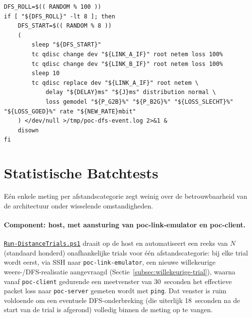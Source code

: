 \begin{listing}[h]
\begin{lstlisting}[style=bashstyle]
DFS_ROLL=$(( RANDOM % 100 ))
if [ "${DFS_ROLL}" -lt 8 ]; then
    DFS_START=$(( RANDOM % 8 ))
    (
        sleep "${DFS_START}"
        tc qdisc change dev "${LINK_A_IF}" root netem loss 100%
        tc qdisc change dev "${LINK_B_IF}" root netem loss 100%
        sleep 10
        tc qdisc replace dev "${LINK_A_IF}" root netem \
            delay "${DELAY}ms" "${J}ms" distribution normal \
            loss gemodel "${P_G2B}%" "${P_B2G}%" "${LOSS_SLECHT}%" "${LOSS_GOED}%" rate "${NEW_RATE}mbit"
    ) </dev/null >/tmp/poc-dfs-event.log 2>&1 &
    disown
fi
\end{lstlisting}
\caption[Willekeurige DFS-onderbreking]{Fragment uit \texttt{poc-run-trial.sh}: bij 8\%
van de trials treedt, op een willekeurig moment binnen de eerste 8~seconden, een volledige
onderbreking van 10~seconden op (Channel Move + Channel Availability Check), waarna het
kanaal automatisch herstelt. De achtergrondtaak wordt met \texttt{disown} losgekoppeld
zodat ze de SSH-sessie die haar opstartte overleeft. Uitgevoerd op:
\texttt{poc-link-emulator}.}
\label{lst:dfs-variatie}
\end{listing}

\section{Statistische Batchtests}%
\label{sec:sim-trials}

Eén enkele meting per afstandscategorie zegt weinig over de betrouwbaarheid van de
architectuur onder wisselende omstandigheden.

\paragraph{Component: host, met aansturing van poc-link-emulator en poc-client.}
\href{code/scripts/Run-DistanceTrials.ps1}{\texttt{Run-DistanceTrials.ps1}} draait op de
host en automatiseert een reeks van $N$ (standaard honderd) onafhankelijke trials voor
één afstandscategorie: bij elke trial wordt eerst, via SSH naar
\texttt{poc-link-emulator}, een nieuwe willekeurige weers-/DFS-realisatie aangevraagd
(Sectie~\ref{subsec:willekeurige-trial}), waarna vanaf \texttt{poc-client} gedurende een
meetvenster van 30~seconden het effectieve packet loss naar \texttt{poc-server} gemeten
wordt met \texttt{ping}. Dat venster is ruim voldoende om een eventuele
DFS-onderbreking (die uiterlijk 18~seconden na de start van de trial is afgerond)
volledig binnen de meting op te vangen.



